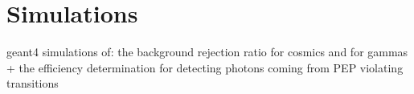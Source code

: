 \chapter{Simulations}
\label{chap:Simulation}

geant4 simulations of: the background rejection ratio for cosmics and for gammas + the efficiency determination for detecting photons coming from PEP violating transitions